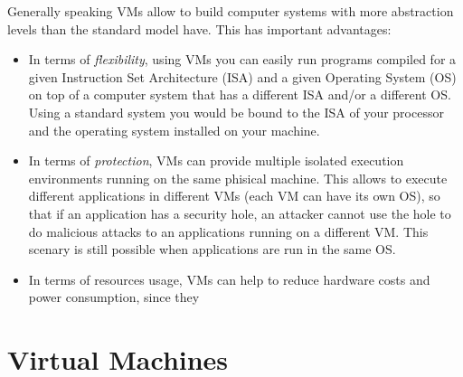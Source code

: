 Generally speaking VMs allow to build computer systems with more abstraction levels than the standard model have. This has important
advantages:
\begin{itemize}
  \item In terms of \emph{flexibility}, using VMs you can easily run programs compiled for a given Instruction Set Architecture (ISA) 
	and a given Operating System (OS) on top of a computer system that has a different ISA and/or a different OS. Using a standard
	system you would be bound to the ISA of your processor and the operating system installed on your machine.

  \item In terms of \emph{protection}, VMs can provide multiple isolated execution environments running on the same phisical machine.
	This allows to execute different applications in different VMs (each VM can have its own OS), so that if an application has a
	security hole, an attacker cannot use the hole to do malicious attacks to an applications running on a different VM. 
	This scenary is still possible when applications are run in the same OS.
  \item In terms of resources usage, VMs can help to reduce hardware costs and power consumption, since they 
\end{itemize}


\section{Virtual Machines}




